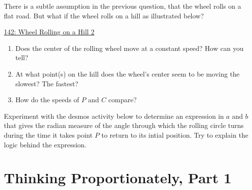 \documentclass{ximera}
\begin{document}
\begin{question} \label{Q9596090}
There is a subtle assumption in the previous question, that the wheel rolls on a flat road. But what if the wheel rolls on a hill as illustrated below?  %

\begin{onlineOnly}
    \begin{center}
\end{center}
\end{onlineOnly}


\href{https://www.desmos.com/calculator/quh7pod92f}{142: Wheel Rolling on a Hill 2}

\begin{enumerate}
\item Does the center of the rolling wheel move at a constant speed? How can you tell?

\item At what point(s) on the hill does the wheel's center seem to be moving the slowest? The fastest?

\item How do the speeds of $P$ and $C$ compare?
\end{enumerate}
\end{question}





\begin{exploration}\label{exp:angles2}
Experiment with the desmos activity below to determine an expression in $a$ and $b$ that gives the radian measure of the angle through which the rolling circle turns during the time it takes point $P$ to return to its intial position. Try to explain the logic behind the expression.


 
\begin{onlineOnly}
    \begin{center}
\end{center}
\end{onlineOnly}
\end{exploration}


\section{Thinking Proportionately, Part 1}
\end{document}
